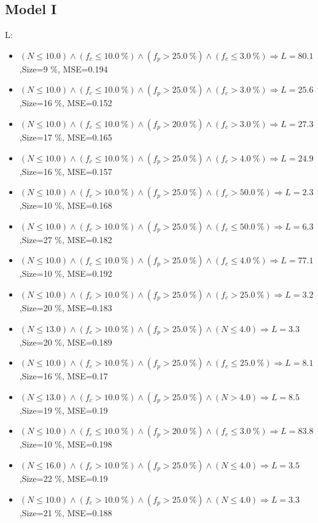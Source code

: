 \documentclass[numbered]{CSL}
\begin{document}
\subsection{Model I}
L:
\begin{itemize}
\item $(N \leq 10.0) \land (f_c \leq 10.0~\%) \land (f_p > 25.0~\%) \land (f_c \leq 3.0~\%) \Rightarrow L = 80.1$,\hfill Size=9 \%, MSE=0.194
\item $(N \leq 10.0) \land (f_c \leq 10.0~\%) \land (f_p > 25.0~\%) \land (f_c > 3.0~\%) \Rightarrow L = 25.6$,\hfill Size=16 \%, MSE=0.152
\item $(N \leq 10.0) \land (f_c \leq 10.0~\%) \land (f_p > 20.0~\%) \land (f_c > 3.0~\%) \Rightarrow L = 27.3$,\hfill Size=17 \%, MSE=0.165
\item $(N \leq 10.0) \land (f_c \leq 10.0~\%) \land (f_p > 25.0~\%) \land (f_c > 4.0~\%) \Rightarrow L = 24.9$,\hfill Size=16 \%, MSE=0.157
\item $(N \leq 10.0) \land (f_c > 10.0~\%) \land (f_p > 25.0~\%) \land (f_c > 50.0~\%) \Rightarrow L = 2.3$,\hfill Size=10 \%, MSE=0.168
\item $(N \leq 10.0) \land (f_c > 10.0~\%) \land (f_p > 25.0~\%) \land (f_c \leq 50.0~\%) \Rightarrow L = 6.3$,\hfill Size=27 \%, MSE=0.182
\item $(N \leq 10.0) \land (f_c \leq 10.0~\%) \land (f_p > 25.0~\%) \land (f_c \leq 4.0~\%) \Rightarrow L = 77.1$,\hfill Size=10 \%, MSE=0.192
\item $(N \leq 10.0) \land (f_c > 10.0~\%) \land (f_p > 25.0~\%) \land (f_c > 25.0~\%) \Rightarrow L = 3.2$,\hfill Size=20 \%, MSE=0.183
\item $(N \leq 13.0) \land (f_c > 10.0~\%) \land (f_p > 25.0~\%) \land (N \leq 4.0) \Rightarrow L = 3.3$,\hfill Size=20 \%, MSE=0.189
\item $(N \leq 10.0) \land (f_c > 10.0~\%) \land (f_p > 25.0~\%) \land (f_c \leq 25.0~\%) \Rightarrow L = 8.1$,\hfill Size=16 \%, MSE=0.17
\item $(N \leq 13.0) \land (f_c > 10.0~\%) \land (f_p > 25.0~\%) \land (N > 4.0) \Rightarrow L = 8.5$,\hfill Size=19 \%, MSE=0.19
\item $(N \leq 10.0) \land (f_c \leq 10.0~\%) \land (f_p > 20.0~\%) \land (f_c \leq 3.0~\%) \Rightarrow L = 83.8$,\hfill Size=10 \%, MSE=0.198
\item $(N \leq 16.0) \land (f_c > 10.0~\%) \land (f_p > 25.0~\%) \land (N \leq 4.0) \Rightarrow L = 3.5$,\hfill Size=22 \%, MSE=0.19
\item $(N \leq 10.0) \land (f_c > 10.0~\%) \land (f_p > 25.0~\%) \land (N \leq 4.0) \Rightarrow L = 3.3$,\hfill Size=21 \%, MSE=0.188

\end{itemize}
\end{document}
